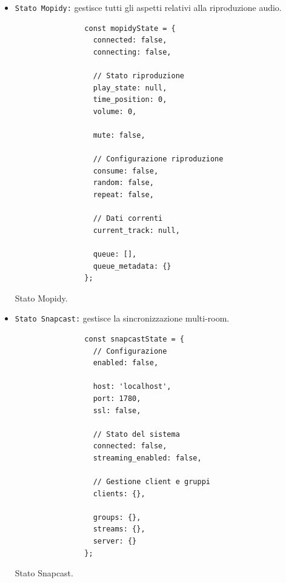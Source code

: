 \begin{itemize}
    \item \texttt{Stato Mopidy:} gestisce tutti gli aspetti relativi alla riproduzione audio.

          \begin{table}[H]
            \begin{minipage}{0.45\textwidth}
              \begin{verbatim}
                const mopidyState = {
                  connected: false,
                  connecting: false,
          
                  // Stato riproduzione
                  play_state: null,
                  time_position: 0,
                  volume: 0,
          
                  mute: false,
          
                  // Configurazione riproduzione
                  consume: false,
                  random: false,
                  repeat: false,
          
                  // Dati correnti
                  current_track: null,
          
                  queue: [],
                  queue_metadata: {}
                };
              \end{verbatim}
            \end{minipage}
            \caption{Stato Mopidy.}
            \label{tab:stato_mopidy}
          \end{table}
          \newpage
    \item \texttt{Stato Snapcast:} gestisce la sincronizzazione multi-room.

          \begin{table}[H]
            \begin{minipage}{0.45\textwidth}
              \begin{verbatim}
                const snapcastState = {
                  // Configurazione
                  enabled: false,
          
                  host: 'localhost',
                  port: 1780,
                  ssl: false,
          
                  // Stato del sistema
                  connected: false,
                  streaming_enabled: false,
          
                  // Gestione client e gruppi
                  clients: {},
          
                  groups: {},
                  streams: {},
                  server: {}
                };
              \end{verbatim}
            \end{minipage}
            \caption{Stato Snapcast.}
            \label{tab:stato_snapcast}
          \end{table}


\end{itemize}
